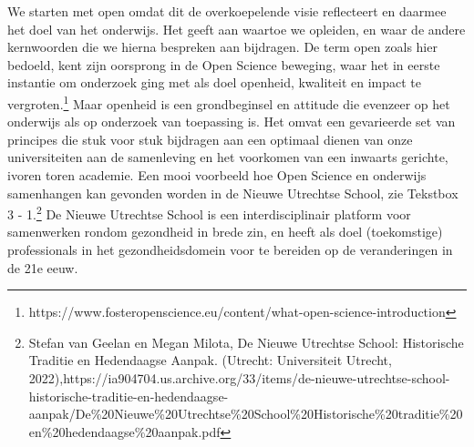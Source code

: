\documentclass{jote-book}
\begin{document}
	We starten met open omdat dit de overkoepelende visie reflecteert en daarmee het doel van het onderwijs. Het geeft aan waartoe we opleiden, en waar de andere kernwoorden die we hierna bespreken aan bijdragen. De term open zoals hier bedoeld, kent zijn oorsprong in de Open Science beweging, waar het in eerste instantie om onderzoek ging met als doel openheid, kwaliteit en impact te vergroten.\footnote{https://www.fosteropenscience.eu/content/what-open-science-introduction} Maar openheid is een grondbeginsel en attitude die evenzeer op het onderwijs als op onderzoek van toepassing is. Het omvat een gevarieerde set van principes die stuk voor stuk bijdragen aan een optimaal dienen van onze universiteiten aan de samenleving en het voorkomen van een inwaarts gerichte, ivoren toren academie. Een mooi voorbeeld hoe Open Science en onderwijs samenhangen kan gevonden worden in de Nieuwe Utrechtse School, zie Tekstbox 3 - 1.\footnote{Stefan van Geelan en Megan Milota, De Nieuwe Utrechtse School: Historische Traditie en Hedendaagse Aanpak. (Utrecht: Universiteit Utrecht, 2022),https://ia904704.us.archive.org/33/items/de-nieuwe-utrechtse-school-historische-traditie-en-hedendaagse-aanpak/De\%20Nieuwe\%20Utrechtse\%20School\%20Historische\%20traditie\%20en\%20hedendaagse\%20aanpak.pdf} De Nieuwe Utrechtse School is een interdisciplinair platform voor samenwerken rondom gezondheid in brede zin, en heeft als doel (toekomstige) professionals in het gezondheidsdomein voor te bereiden op de veranderingen in de 21e eeuw.
\end{document}
